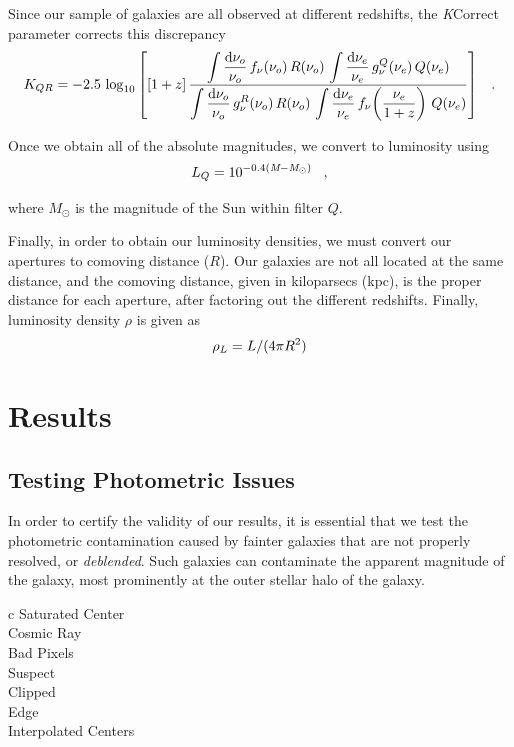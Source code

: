 \documentclass[apj]{emulateapj}
\newcommand{\nuobs}{\nu_o}
\newcommand{\nuemit}{\nu_e}
\begin{document}
Since our sample of galaxies are all observed at different redshifts, the \textit{K}Correct parameter corrects this discrepancy
\begin{equation}
\scriptsize{
K_{QR} = -2.5\,\log_{10}\left[[1+z]\,
  \frac{\displaystyle\int\frac{\mathrm{d}\nuobs}{\nuobs}\,f_{\nu}(\nuobs)\,R(\nuobs)\,
          \int\frac{\mathrm{d}\nuemit}{\nuemit}\,g^Q_{\nu}(\nuemit)\,Q(\nuemit)}
       {\displaystyle
          \int\frac{\mathrm{d}\nuobs}{\nuobs}\,g^R_{\nu}(\nuobs)\,R(\nuobs)\,
          \int\frac{\mathrm{d}\nuemit}{\nuemit}\,
            f_{\nu}\!\left(\frac{\nuemit}{1+z}\right)\,Q(\nuemit)}\right] \;\;\;.
            }
\end{equation}

Once we obtain all of the absolute magnitudes, we convert to luminosity using
\begin{equation}
\small{
L_Q=10^{-0.4(\textit{M}-\textit{M}_{\odot})} \;\;\;,
}
\end{equation}

where $\textit{M}_{\odot}$ is the magnitude of the Sun within filter $Q$. 

Finally, in order to obtain our luminosity densities, we must convert our apertures to comoving distance ($R$). Our galaxies are not all located at the same distance, and the comoving distance, given in kiloparsecs (kpc), is the proper distance for each aperture, after factoring out the different redshifts. Finally, luminosity density $\rho$ is given as
\begin{equation}
\small{
\rho_L=L/(4\pi R^2)
}
\end{equation}

\section{Results}
\subsection{Testing Photometric Issues}
In order to certify the validity of our results, it is essential that we test the photometric contamination caused by fainter galaxies that are not properly resolved, or \textit{deblended}. Such galaxies can contaminate the apparent magnitude of the galaxy, most prominently at the outer stellar halo of the galaxy.

\begin{deluxetable}{c}
\tabletypesize{\footnotesize}
\startdata
Saturated Center\\
Cosmic Ray \\
Bad Pixels \\
Suspect \\
Clipped\\
Edge\\
Interpolated Centers \\
\enddata
\end{deluxetable}
\end{document}
